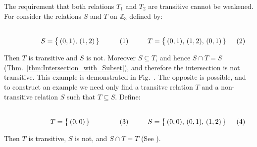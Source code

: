     \begin{example}
        The requirement that both relations $T_{1}$ and $T_{2}$ are transitive
        cannot be weakened. For consider the relations $S$ and $T$ on
        $\mathbb{Z}_{3}$ defined by:
        \par\hfill\par
        \begin{subequations}
            \begin{minipage}[b]{0.49\textwidth}
                \centering
                \begin{equation}
                    S=\big\{\,(0,1),\,(1,2)\,\}
                \end{equation}
            \end{minipage}
            \hfill
            \begin{minipage}[b]{0.49\textwidth}
                \centering
                \begin{equation}
                    T=\big\{\,(0,1),\,(1,2),\,(0,1)\,\}
                \end{equation}
            \end{minipage}
        \end{subequations}
        \par\vspace{2.5ex}
        Then $T$ is transitive and $S$ is not. Moreover $S\subseteq{T}$, and
        hence $S\cap{T}=S$ (Thm.~\ref{thm:Intersection_with_Subset}), and
        therefore the intersection is not transitive. This example is
        demonstrated in
        Fig.~. The
        opposite is possible, and to construct an example we need only find a
        transitve relation $T$ and a non-transitive relation $S$ such that
        $T\subseteq{S}$. Define:
        \par\hfill\par
        \begin{subequations}
            \begin{minipage}[b]{0.49\textwidth}
                \centering
                \begin{equation}
                    T=\big\{\,(0,0)\,\}
                \end{equation}
            \end{minipage}
            \hfill
            \begin{minipage}[b]{0.49\textwidth}
                \centering
                \begin{equation}
                    S=\big\{\,(0,0),\,(0,1),\,(1,2)\,\}
                \end{equation}
            \end{minipage}
        \end{subequations}
        \par\vspace{2.5ex}
        Then $T$ is transitive, $S$ is not, and $S\cap{T}=T$
        (See ).
    \end{example}
